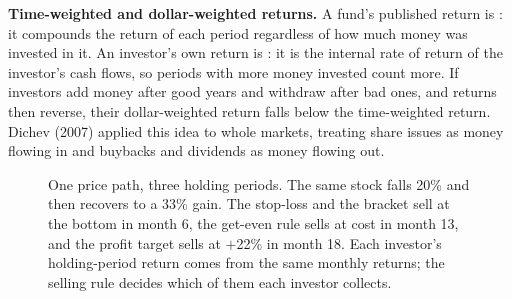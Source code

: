 \textbf{Time-weighted and dollar-weighted returns.} A fund's published return is : it compounds the return of each period regardless of how much money was invested in it. An investor's own return is : it is the internal rate of return of the investor's cash flows, so periods with more money invested count more. If investors add money after good years and withdraw after bad ones, and returns then reverse, their dollar-weighted return falls below the time-weighted return. Dichev (2007) applied this idea to whole markets, treating share issues as money flowing in and buybacks and dividends as money flowing out.

\begin{figure}[htbp]
\centering
{}
\caption{One price path, three holding periods. The same stock falls 20\% and then recovers to a 33\% gain. The stop-loss and the bracket sell at the bottom in month 6, the get-even rule sells at cost in month 13, and the profit target sells at $+$22\% in month 18. Each investor's holding-period return comes from the same monthly returns; the selling rule decides which of them each investor collects.}
\label{fig:hp-path}
\end{figure}


